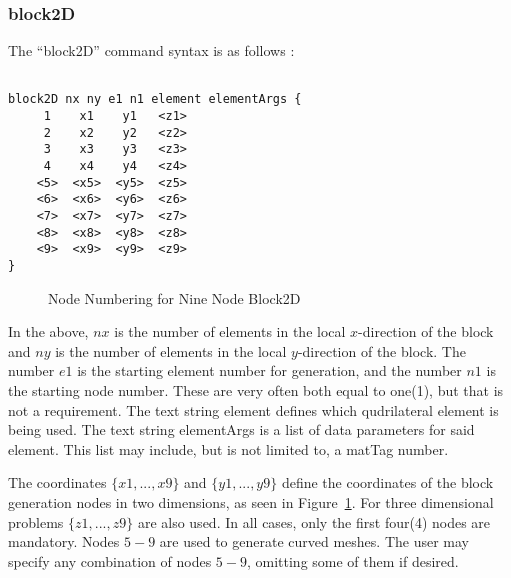 \documentclass[12pt]{article}
\begin{document}
\subsubsection{block2D}
The ``block2D'' command syntax is as follows :
{\sf\small
\begin{verbatim}

block2D nx ny e1 n1 element elementArgs {
     1    x1    y1   <z1>
     2    x2    y2   <z2>
     3    x3    y3   <z3>
     4    x4    y4   <z4>
    <5>  <x5>  <y5>  <z5>
    <6>  <x6>  <y6>  <z6>
    <7>  <x7>  <y7>  <z7>
    <8>  <x8>  <y8>  <z8>
    <9>  <x9>  <y9>  <z9>
}
\end{verbatim}

\begin{figure}[htpb]
\begin{center}
\epsfysize=2.0in
\end{center}
\caption{Node Numbering for Nine Node Block2D}
\label{blocknodenumbering}
\end{figure}
}

In the above, $nx$ is the number of elements in the local $x$-direction of
the block and $ny$ is the number of elements in the local $y$-direction of
the block.  The number $e1$ is the starting element number for generation, and 
the number $n1$ is the starting node number.  These are very often both equal to 
one(1), but that is not a requirement.  The text string \p element defines 
which qudrilateral element is being used.  The text string \p elementArgs
is a list of data parameters for said element.  This list may include, but is
not limited to, a matTag number.

The coordinates $\{x1,...,x9\}$ and $\{y1,...,y9\}$ define the coordinates
of the block generation nodes in two dimensions, as seen in Figure~\ref{blocknodenumbering}.
For three dimensional 
problems $\{z1,...,z9\}$ are also used.  In all cases, only the first four(4) 
nodes are mandatory. Nodes $5-9$ are used to generate curved meshes.
The user may specify any combination of nodes $5-9$, omitting some of them
if desired.
\end{document}
